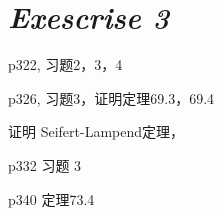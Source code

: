 \chapter{\textsl{Exescrise 3}}

p322, 习题2，3，4

p326, 习题3，证明定理69.3，69.4

证明 Seifert-Lampend定理，

p332 习题 3

p340 定理73.4